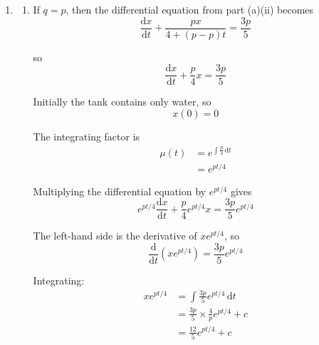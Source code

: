 \documentclass[leqno]{article}
\begin{document}
\begin{enumerate}[
  label=\textbf{\arabic*.},
  leftmargin=*,
  topsep=0pt,
  partopsep=0pt,
  parsep=0pt
]
\begin{djsSolution}
\begin{enumerate}[label=\textbf{(\alph*)}]
\begin{enumerate}[label=(\roman*)]
    \item
    The flavouring liquid entering the tank is $60\%$ concentrate, so the rate at which concentrate enters is
    \[
    0.6p=\frac{3p}{5}
    \]

    From part (i), the proportion of concentrate in the tank is $\frac{x}{4+(p-q)t}$, so the rate at which concentrate leaves is
    \[
    q\left(\frac{x}{4+(p-q)t}\right)=\frac{qx}{4+(p-q)t}
    \]

    Therefore
    \begin{align*}
    \frac{\mathrm{d}x}{\mathrm{d}t}
    &= \text{rate in} - \text{rate out} \\
    &= \frac{3p}{5}-\frac{qx}{4+(p-q)t}
    \end{align*}

    Rearranging:
    \[
    \frac{\mathrm{d}x}{\mathrm{d}t}+\frac{qx}{4+(p-q)t}=\frac{3p}{5}
    \]

    as required.
  \end{enumerate}

  \item
  \begin{enumerate}[label=(\roman*)]
    \item
    If $q=p$, then the differential equation from part (a)(ii) becomes
    \[
    \frac{\mathrm{d}x}{\mathrm{d}t}+\frac{px}{4+(p-p)t}=\frac{3p}{5}
    \]

    so
    \[
    \frac{\mathrm{d}x}{\mathrm{d}t}+\frac{p}{4}x=\frac{3p}{5}
    \]

    Initially the tank contains only water, so
    \[
    x(0)=0
    \]

    The integrating factor is
    \begin{align*}
    \mu(t)&=e^{\int \frac{p}{4}\,\mathrm{d}t}\\
    &=e^{pt/4}
    \end{align*}

    Multiplying the differential equation by $e^{pt/4}$ gives
    \[
    e^{pt/4}\frac{\mathrm{d}x}{\mathrm{d}t}+\frac{p}{4}e^{pt/4}x=\frac{3p}{5}e^{pt/4}
    \]

    The left-hand side is the derivative of $xe^{pt/4}$, so
    \[
    \frac{\mathrm{d}}{\mathrm{d}t}\left(xe^{pt/4}\right)=\frac{3p}{5}e^{pt/4}
    \]

    Integrating:
    \begin{align*}
    xe^{pt/4}
    &= \int \frac{3p}{5}e^{pt/4}\,\mathrm{d}t \\
    &= \frac{3p}{5}\times\frac{4}{p}e^{pt/4}+c \\
    &= \frac{12}{5}e^{pt/4}+c
    \end{align*}


\end{enumerate}
\end{enumerate}
\end{djsSolution}
\end{enumerate}
\end{document}
